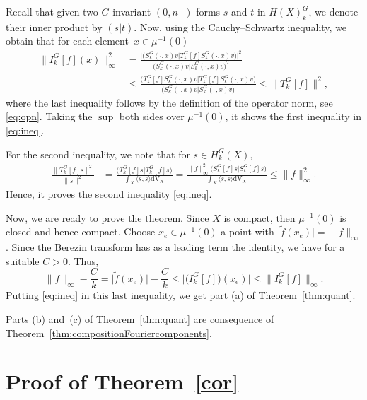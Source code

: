 \documentclass[pdftex]{sigma}
\numberwithin{equation}{section}
\begin{document}
	
	Recall that given two $G$ invariant $(0, n_-)$ forms $s$ and $t$ in $H(X)^G_k$, we denote their inner product by $(s\vert t)$. Now, using the Cauchy--Schwartz inequality, we obtain that for each element~${x\in \mu^{-1}(0)}$
	\begin{align*}
	\big\lVert I^{G}_k[f](x) \big\rVert^2_{\infty}&= \frac{\big\vert\bigl(S^{G}_k(\cdot, x) v\big\vert T^{G}_{k}[f] S^{G}_k(\cdot, x) v\bigr)\big\vert^2}{\bigl(S^{G}_k(\cdot, x) v\big\vert S^{G}_k(\cdot, x) v\bigr)^2} \\
	&\leq \frac{\bigl(T^{G}_{k}[f] S^{G}_k(\cdot, x) v\big\vert T^{G}_{k}[f] S^{G}_k(\cdot, x) v\bigr)}{\bigl(S^{G}_k(\cdot, x) v\big\vert S^{G}_k(\cdot, x) v\bigr)}
	\leq \rVert T^{G}_k[f]\lVert^2,
\end{align*}
 	where the last inequality follows by the definition of the operator norm, see \eqref{eq:opn}. Taking the $\sup$ both sides over $\mu^{-1}(0)$, it shows the first inequality in \eqref{eq:ineq}.
 	
 	For the second inequality, we note that for $s \in H^{G}_k(X)$,
 	\begin{align*}
 \frac{\lVert T^{G}_k[f] s \rVert^2}{\lVert s \rVert^2}&=\frac{\bigl(T^{G}_{k}[f] s \big\vert T^{G}_{k}[f] s\bigr)}{\int_X \langle s, s\rangle \mathrm{dV}_X} = \frac{\lVert f\rVert^2_{\infty} \bigl(S^{G}_{k}[f] s \big\vert S^{G}_{k}[f] s\bigr)}{\int_{X} \langle s, s\rangle \mathrm{dV}_{X}}
 		\leq \lVert f\rVert^2_{\infty} .
 	\end{align*}
 	Hence, it proves the second inequality \eqref{eq:ineq}.
 	
 	Now, we are ready to prove the theorem. Since $X$ is compact, then $\mu^{-1}(0)$ is closed and hence compact. Choose $x_e\in \mu^{-1}(0)$ a point with $\big\lvert \widetilde{f}(x_e)\big\rvert=\lVert f \rVert_{\infty}$. Since the Berezin transform has as a leading term the identity, we have
 	for a suitable $C>0$. Thus,
 	\[ \lVert f \rVert_{\infty}-\frac{C}{k}= \big\lvert \widetilde{f}(x_e)\big\rvert -\frac{C}{k}\leq \big\lvert \bigl(I^{G}_k[f]\bigr)(x_e)\big\rvert \leq \big\lVert I^{G}_k[f]\big\rVert_{\infty} .\]
 	Putting \eqref{eq:ineq} in this last inequality, we get part (a) of Theorem~\ref{thm:quant}.
 	
 	Parts (b) and~(c) of Theorem~\ref{thm:quant} are consequence of Theorem~\ref{thm:compositionFouriercomponents}.
 	
 	\section[Proof of Theorem \ref{cor}]{Proof of Theorem~\ref{cor}}
 	\label{sec:proofcor}
 	
\end{document}
